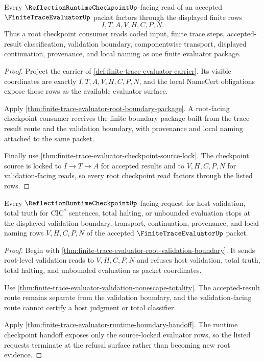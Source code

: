 \begin{theorem}
\label{thm:finitetraceevaluator-root-checkpoint-totality}
Every $\ReflectionRuntimeCheckpointUp$-facing read of an accepted
$\FiniteTraceEvaluatorUp$ packet factors through the displayed finite rows
$$
I,T,A,V,H,C,P,N.
$$
Thus a root checkpoint consumer reads coded input, finite trace steps,
accepted-result classification, validation boundary, componentwise transport,
displayed continuation, provenance, and local naming as one finite evaluator
package.
\end{theorem}
\begin{proof}
Project the carrier of \autoref{def:finite-trace-evaluator-carrier}. Its
visible coordinates are exactly $I,T,A,V,H,C,P,N$, and the local NameCert
obligations expose those rows as the available evaluator surface.

Apply \autoref{thm:finite-trace-evaluator-root-boundary-package}. A
root-facing checkpoint consumer receives the finite boundary package built
from the trace-result route and the validation boundary, with provenance and
local naming attached to the same packet.

Finally use \autoref{thm:finite-trace-evaluator-checkpoint-source-lock}. The
checkpoint source is locked to $I \to T \to A$ for accepted results and to
$V,H,C,P,N$ for validation-facing reads, so every root checkpoint read factors
through the listed rows.
\end{proof}

\begin{theorem}
\label{thm:finitetraceevaluator-root-validation-refusal}
Every $\ReflectionRuntimeCheckpointUp$-facing request for host validation,
total truth for $\mathrm{CIC}^{*}$ sentences, total halting, or unbounded
evaluation stops at the displayed validation-boundary, transport,
continuation, provenance, and local naming rows $V,H,C,P,N$ of the accepted
$\FiniteTraceEvaluatorUp$ packet.
\end{theorem}
\begin{proof}
Begin with \autoref{thm:finite-trace-evaluator-root-validation-boundary}. It
sends root-level validation reads to $V,H,C,P,N$ and refuses host validation,
total truth, total halting, and unbounded evaluation as packet coordinates.

Use \autoref{thm:finite-trace-evaluator-validation-nonescape-totality}. The
accepted-result route remains separate from the validation boundary, and the
validation-facing route cannot certify a host judgment or total classifier.

Apply \autoref{thm:finite-trace-evaluator-runtime-boundary-handoff}. The
runtime checkpoint handoff exposes only the source-locked evaluator rows, so
the listed requests terminate at the refusal surface rather than becoming new
root evidence.
\end{proof}

